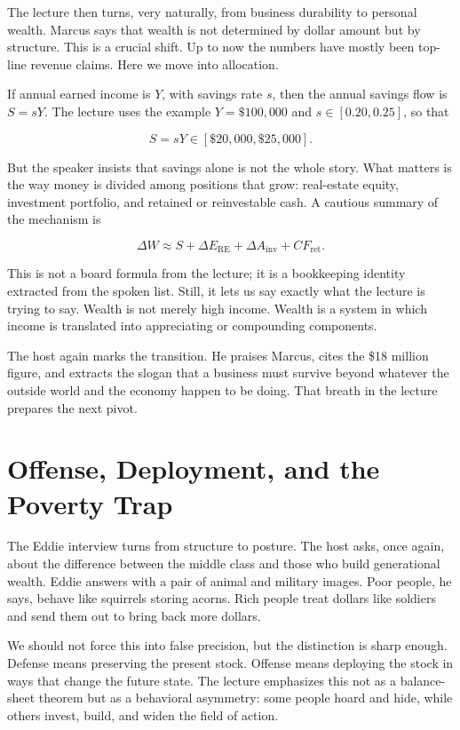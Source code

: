 The lecture then turns, very naturally, from business durability to personal wealth. Marcus says that wealth is not determined by dollar amount but by structure. This is a crucial shift. Up to now the numbers have mostly been top-line revenue claims. Here we move into allocation.

If annual earned income is \(Y\), with savings rate \(s\), then the annual savings flow is \(S=sY\). The lecture uses the example \(Y=\$100{,}000\) and \(s\in[0.20,0.25]\), so that

\begin{equation}
S=sY\in[\$20{,}000,\$25{,}000].
\end{equation}

But the speaker insists that savings alone is not the whole story. What matters is the way money is divided among positions that grow: real-estate equity, investment portfolio, and retained or reinvestable cash. A cautious summary of the mechanism is

\begin{equation}
\Delta W \approx S+\Delta E_{\mathrm{RE}}+\Delta A_{\mathrm{inv}}+CF_{\mathrm{ret}}.
\end{equation}

This is not a board formula from the lecture; it is a bookkeeping identity extracted from the spoken list. Still, it lets us say exactly what the lecture is trying to say. Wealth is not merely high income. Wealth is a system in which income is translated into appreciating or compounding components.

The host again marks the transition. He praises Marcus, cites the \$18 million figure, and extracts the slogan that a business must survive beyond whatever the outside world and the economy happen to be doing. That breath in the lecture prepares the next pivot.

\section{Offense, Deployment, and the Poverty Trap}

The Eddie interview turns from structure to posture. The host asks, once again, about the difference between the middle class and those who build generational wealth. Eddie answers with a pair of animal and military images. Poor people, he says, behave like squirrels storing acorns. Rich people treat dollars like soldiers and send them out to bring back more dollars.

We should not force this into false precision, but the distinction is sharp enough. Defense means preserving the present stock. Offense means deploying the stock in ways that change the future state. The lecture emphasizes this not as a balance-sheet theorem but as a behavioral asymmetry: some people hoard and hide, while others invest, build, and widen the field of action.

